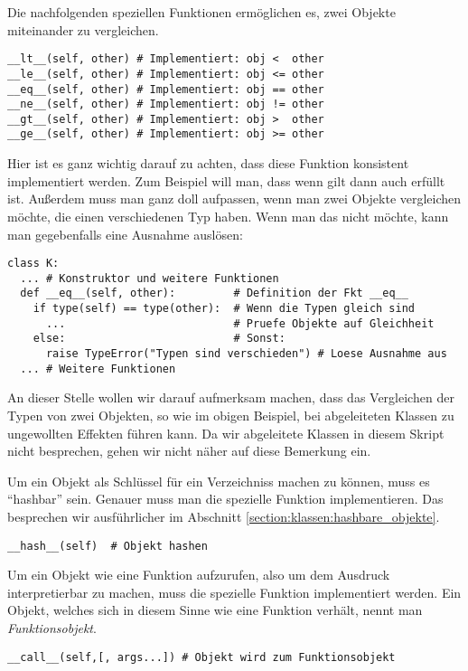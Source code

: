 Die nachfolgenden speziellen Funktionen ermöglichen es, zwei Objekte miteinander zu vergleichen.
\begin{lstlisting}
__lt__(self, other) # Implementiert: obj <  other
__le__(self, other) # Implementiert: obj <= other
__eq__(self, other) # Implementiert: obj == other
__ne__(self, other) # Implementiert: obj != other
__gt__(self, other) # Implementiert: obj >  other
__ge__(self, other) # Implementiert: obj >= other
\end{lstlisting}
Hier ist es ganz wichtig darauf zu achten, dass diese Funktion konsistent implementiert werden.
Zum Beispiel will man, dass wenn  gilt dann auch  erfüllt ist.
Außerdem muss man ganz doll aufpassen, wenn man zwei Objekte vergleichen möchte, die einen verschiedenen Typ haben.
Wenn man das nicht möchte, kann man gegebenfalls eine Ausnahme auslösen:
\begin{lstlisting}
class K:
  ... # Konstruktor und weitere Funktionen
  def __eq__(self, other):         # Definition der Fkt __eq__
    if type(self) == type(other):  # Wenn die Typen gleich sind
      ...                          # Pruefe Objekte auf Gleichheit
    else:                          # Sonst:
      raise TypeError("Typen sind verschieden") # Loese Ausnahme aus
  ... # Weitere Funktionen
\end{lstlisting}
An dieser Stelle wollen wir darauf aufmerksam machen, dass das Vergleichen der Typen von zwei Objekten, so wie im obigen Beispiel, bei abgeleiteten Klassen zu ungewollten Effekten führen kann.
Da wir abgeleitete Klassen in diesem Skript nicht besprechen, gehen wir nicht näher auf diese Bemerkung ein.

Um ein Objekt als Schlüssel für ein Verzeichniss machen zu können, muss es ``hashbar'' sein.
Genauer muss man die spezielle Funktion  implementieren.
Das besprechen wir ausführlicher im Abschnitt \ref{section:klassen:hashbare_objekte}.
\begin{lstlisting}
__hash__(self)  # Objekt hashen
\end{lstlisting}

Um ein Objekt  wie eine Funktion aufzurufen, also um dem Ausdruck  interpretierbar zu machen,
muss die spezielle Funktion  implementiert werden.
Ein Objekt, welches sich in diesem Sinne wie eine Funktion verhält, nennt man \emph{Funktionsobjekt}.
\begin{lstlisting}
__call__(self,[, args...]) # Objekt wird zum Funktionsobjekt
\end{lstlisting}

